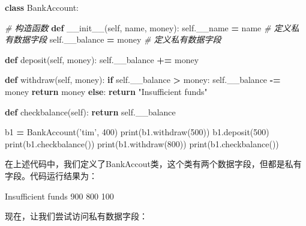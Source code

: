 \documentclass[]{ctexbook}
\newenvironment{Shaded}{\begin{snugshade}}{\end{snugshade}}
\newcommand{\BuiltInTok}[1]{#1}
\newcommand{\CommentTok}[1]{\textcolor[rgb]{0.56,0.35,0.01}{\textit{#1}}}
\newcommand{\ControlFlowTok}[1]{\textcolor[rgb]{0.13,0.29,0.53}{\textbf{#1}}}
\newcommand{\DecValTok}[1]{\textcolor[rgb]{0.00,0.00,0.81}{#1}}
\newcommand{\FunctionTok}[1]{\textcolor[rgb]{0.00,0.00,0.00}{#1}}
\newcommand{\KeywordTok}[1]{\textcolor[rgb]{0.13,0.29,0.53}{\textbf{#1}}}
\newcommand{\NormalTok}[1]{#1}
\newcommand{\OperatorTok}[1]{\textcolor[rgb]{0.81,0.36,0.00}{\textbf{#1}}}
\newcommand{\StringTok}[1]{\textcolor[rgb]{0.31,0.60,0.02}{#1}}
\newcommand{\VariableTok}[1]{\textcolor[rgb]{0.00,0.00,0.00}{#1}}
\begin{document}
\begin{Shaded}
\begin{Highlighting}[]
\KeywordTok{class}\NormalTok{ BankAccount:}

     \CommentTok{# 构造函数}
    \KeywordTok{def} \FunctionTok{__init__}\NormalTok{(}\VariableTok{self}\NormalTok{, name, money):}
        \VariableTok{self}\NormalTok{.__name }\OperatorTok{=}\NormalTok{ name  }\CommentTok{# 定义私有数据字段}
        \VariableTok{self}\NormalTok{.__balance }\OperatorTok{=}\NormalTok{ money  }\CommentTok{# 定义私有数据字段}

    \KeywordTok{def}\NormalTok{ deposit(}\VariableTok{self}\NormalTok{, money):}
        \VariableTok{self}\NormalTok{.__balance }\OperatorTok{+=}\NormalTok{ money}

    \KeywordTok{def}\NormalTok{ withdraw(}\VariableTok{self}\NormalTok{, money):}
        \ControlFlowTok{if} \VariableTok{self}\NormalTok{.__balance }\OperatorTok{>}\NormalTok{ money:}
            \VariableTok{self}\NormalTok{.__balance }\OperatorTok{-=}\NormalTok{ money}
            \ControlFlowTok{return}\NormalTok{ money}
        \ControlFlowTok{else}\NormalTok{:}
            \ControlFlowTok{return} \StringTok{"Insufficient funds"}

    \KeywordTok{def}\NormalTok{ checkbalance(}\VariableTok{self}\NormalTok{):}
        \ControlFlowTok{return} \VariableTok{self}\NormalTok{.__balance}

\NormalTok{b1 }\OperatorTok{=}\NormalTok{ BankAccount(}\StringTok{'tim'}\NormalTok{, }\DecValTok{400}\NormalTok{)}
\BuiltInTok{print}\NormalTok{(b1.withdraw(}\DecValTok{500}\NormalTok{))}
\NormalTok{b1.deposit(}\DecValTok{500}\NormalTok{)}
\BuiltInTok{print}\NormalTok{(b1.checkbalance())}
\BuiltInTok{print}\NormalTok{(b1.withdraw(}\DecValTok{800}\NormalTok{))}
\BuiltInTok{print}\NormalTok{(b1.checkbalance())}
\end{Highlighting}
\end{Shaded}

在上述代码中，我们定义了BankAccout类，这个类有两个数据字段，但都是私有字段。代码运行结果为：

\begin{Shaded}
\begin{Highlighting}[]
\NormalTok{Insufficient funds}
\DecValTok{900}
\DecValTok{800}
\DecValTok{100}
\end{Highlighting}
\end{Shaded}

现在，让我们尝试访问私有数据字段：
\end{document}

